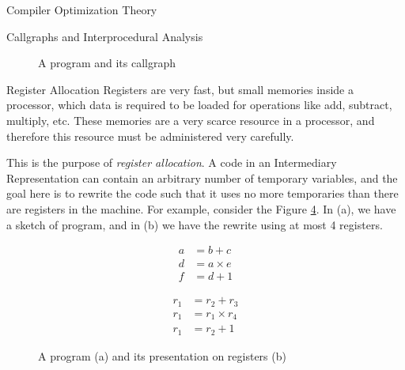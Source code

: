 \begin{section}{Compiler Optimization Theory}
\begin{subsection}{Callgraphs and Interprocedural Analysis}
\begin{figure}[ht]
\begin{subfigure}[b]{0.40\textwidth}
\begin{center}
{
    }
    \end{center}
  \end{subfigure}
  \caption{A program and its callgraph}
  \label{fig:call_graph}
\end{figure}

\end{subsection}

\begin{subsection}{Register Allocation}
	Registers are very fast, but small memories inside a processor, which data is
	required to be loaded for operations like add, subtract, multiply, etc. These
	memories are a very scarce resource in a processor, and therefore this resource
	must be administered very carefully.

	This is the purpose of \textit{register allocation}. A code in an
	Intermediary Representation can contain an arbitrary number of temporary
	variables, and the goal here is to rewrite the code such that it uses no
	more temporaries than there are registers in the machine. For example,
	consider the Figure \ref{fig:register_ir}. In (a), we have a sketch of
	program, and in (b) we have the rewrite using at most 4 registers.

\begin{figure}[ht]
    \centering
    \begin{subfigure}[b]{0.40\textwidth}
		\begin{align}
			a &= b + c      \nonumber \\
			d &= a \times e \nonumber \\
			f &= d + 1      \nonumber
		\end{align}
        \caption{\label{fig:code_normal}}
    \end{subfigure}
    \begin{subfigure}[b]{0.40\textwidth}
		\begin{align}
			r_1 &= r_2 + r_3      \nonumber \\
			r_1 &= r_1 \times r_4 \nonumber \\
			r_1 &= r_2 + 1        \nonumber
		\end{align}
        \caption{\label{fig:code_register}}
\end{subfigure}
\caption{A program (a) and its presentation on registers (b)}
\label{fig:register_ir}
\end{figure}


\end{subsection}
\end{section}
